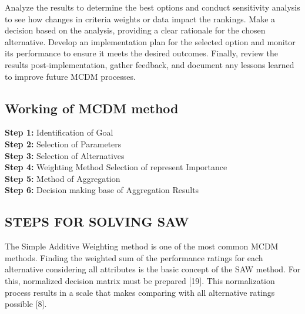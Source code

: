 \documentclass[12pt,a4paper]{article}
\begin{document}
Analyze the results to determine the best options and conduct sensitivity analysis to see how changes in criteria weights or data impact the rankings. Make a decision based on the analysis, providing a clear rationale for the chosen alternative. Develop an implementation plan for the selected option and monitor its performance to ensure it meets the desired outcomes. Finally, review the results post-implementation, gather feedback, and document any lessons learned to improve future MCDM processes.

\subsection*{Working of MCDM method}
 \textbf{Step 1:} Identification of Goal\\
 \textbf{Step 2:} Selection of Parameters\\
 \textbf{Step 3:} Selection of Alternatives\\
 \textbf{Step 4:} Weighting Method Selection of represent Importance\\ 
 \textbf{Step 5:} Method of Aggregation\\ 
 \textbf{Step 6:} Decision making base of Aggregation Results
 
\subsection{STEPS FOR SOLVING SAW}

\hspace{1em}The Simple Additive Weighting method is one of 
the most common MCDM methods. Finding the weighted sum of the performance ratings for each alternative considering all attributes is the basic concept of the SAW method. For this, normalized decision matrix must be prepared [19]. This normalization process results in a scale that makes comparing with all alternative ratings possible [8].\\

\begin{center}
\end{center}
\end{document}
